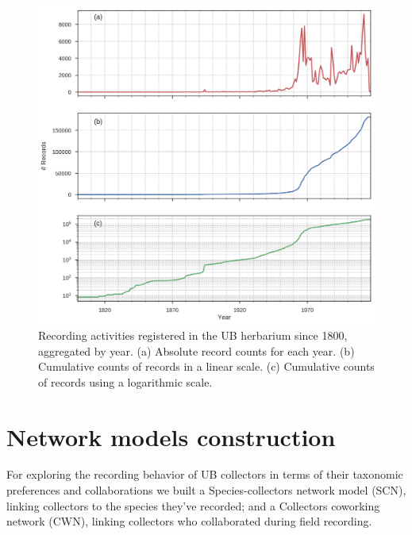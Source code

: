   \begin{figure}[h!]
  	\centering
    \includegraphics[width=\linewidth]{figures/ub_records_timeseries.png}
    \caption{Recording activities registered in the UB herbarium since 1800, aggregated by year. (a) Absolute record counts for each year. (b) Cumulative counts of records in a linear scale. (c) Cumulative counts of records using a logarithmic scale.}
    \label{fig:ub_records_timeseries}
  \end{figure}


\section{Network models construction}


\newcommand{\ubNumSpNodes}{15344}
\newcommand{\ubNumColNodes}{6768}
\newcommand{\ubSCNNumEdges}{142647}
For exploring the recording behavior of UB collectors in terms of their taxonomic preferences and collaborations we built a Species-collectors network model (SCN), linking collectors to the species they've recorded; and a Collectors coworking network (CWN), linking collectors who collaborated during field recording.


